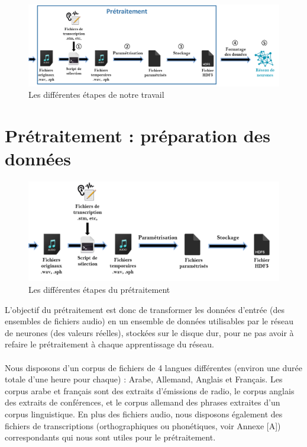 \documentclass{article}
\begin{document}
\begin{figure}[h]
  \centerline{\includegraphics[scale=0.7]{img/schema_complet.png}}
  \caption{Les différentes étapes de notre travail}
\end{figure}
 
\section{Prétraitement : préparation des données}
\hphantom{.}
\begin{figure}[h]
  \centerline{\includegraphics[scale=0.9]{img/schema_pretraitement.png}}
  \caption{Les différentes étapes du prétraitement}
\end{figure}

L'objectif du prétraitement est donc de transformer les données d'entrée (des ensembles de fichiers audio) en un ensemble de données utilisables par le réseau de neurones (des valeurs réelles), stockées sur le disque dur, pour ne pas avoir à refaire le prétraitement à chaque apprentissage du réseau.\\
 \\
 Nous disposons d'un corpus de fichiers de 4 langues différentes (environ une durée totale d'une heure pour chaque) : Arabe, Allemand, Anglais et Français. Les corpus arabe et français sont des extraits d'émissions de radio, le corpus anglais des extraits de conférences, et le corpus allemand des phrases extraites d'un corpus linguistique. En plus des fichiers audio, nous disposons également des fichiers de transcriptions (orthographiques ou phonétiques, voir Annexe [A]) correspondants qui nous sont utiles pour le prétraitement.
\end{document}
